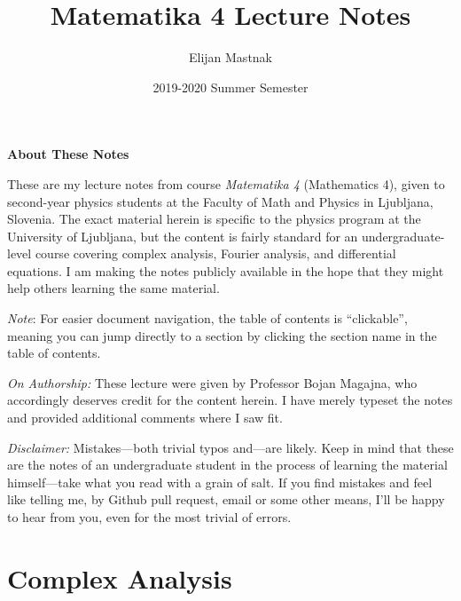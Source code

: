 \documentclass[11pt, a4paper]{article}
\begin{document}
\title{Matematika 4 Lecture Notes}
\author{Elijan Mastnak}
\date{2019-2020 Summer Semester}
\maketitle

\begin{center}
\textbf{About These Notes}
\end{center}
These are my lecture notes from course \textit{Matematika 4} (Mathematics 4), given to second-year physics students at the Faculty of Math and Physics in Ljubljana, Slovenia. The exact material herein is specific to the physics program at the University of Ljubljana, but the content is fairly standard for an undergraduate-level course covering complex analysis, Fourier analysis, and differential equations. I am making the notes publicly available in the hope that they might help others learning the same material.

\vspace{2mm}
\textit{Note}: For easier document navigation, the table of contents is ``clickable'', meaning you can jump directly to a section by clicking the section name in the table of contents.

\vspace{2mm}
\textit{On Authorship:} These lecture were given by Professor Bojan Magajna, who accordingly deserves credit for the content herein. I have merely typeset the notes and provided additional comments where I saw fit.


\vspace{2mm}
\textit{Disclaimer:} Mistakes---both trivial typos and---are likely. Keep in mind that these are the notes of an undergraduate student in the process of learning the material himself---take what you read with a grain of salt. If you find mistakes and feel like telling me, by Github pull request, email or some other means, I'll be happy to hear from you, even for the most trivial of errors.



\tableofcontents

\newpage

\section{Complex Analysis}
\end{document}
